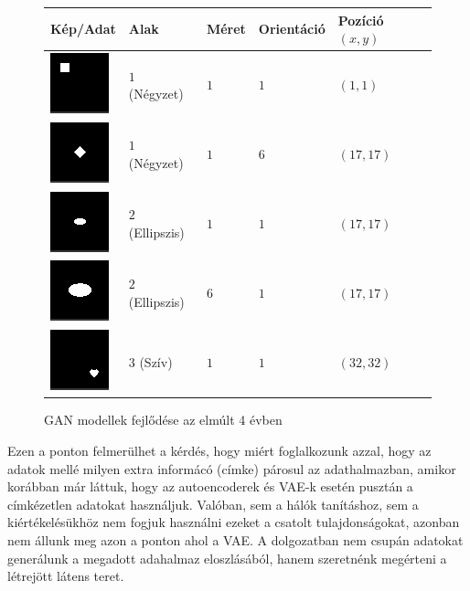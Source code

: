 \documentclass[12pt]{article}
\begin{document}
\begin{figure}[h!]
\begin{center}
\label{samples}
\begin{tabular}{| m{2.5cm} | m{2.5cm} | m{2cm}  | m{2cm} |  m{2.5cm} |}
\hline
Kép/Adat & Alak & Méret & Orientáció & Pozíció $(x,y)$ \\
\hline\hline
\includegraphics{sample00000.png} & $1$ (Négyzet) & $1$ & $1$ & $(1,1)$ \\
\hline
\includegraphics{sample0051616.png} & $1$ (Négyzet) & $1$ & $6$ & $(17,17)$ \\
\hline
\includegraphics{sample1001616.png} & $2$ (Ellipszis) & $1$ & $1$ & $(17,17)$ \\
\hline
\includegraphics{sample1501616.png} & $2$ (Ellipszis) & $6$ & $1$ & $(17,17)$ \\
\hline
\includegraphics{sample2003131.png} & $3$ (Szív) & $1$ & $1$ & $(32,32)$ \\
\hline
\end{tabular}
\end{center}
\caption{GAN modellek fejlődése az elmúlt 4 évben}
\end{figure}

Ezen a ponton felmerülhet a kérdés, hogy miért foglalkozunk azzal, hogy az adatok mellé milyen extra informácó (címke) párosul az adathalmazban, amikor korábban már láttuk, hogy az autoencoderek és VAE-k esetén pusztán a címkézetlen adatokat használjuk. Valóban, sem a hálók tanításhoz, sem a kiértékelésükhöz nem fogjuk használni ezeket a csatolt tulajdonságokat, azonban nem állunk meg azon a ponton ahol a VAE. A dolgozatban nem csupán adatokat generálunk a megadott adahalmaz eloszlásából, hanem szeretnénk megérteni a létrejött látens teret.
\end{document}
